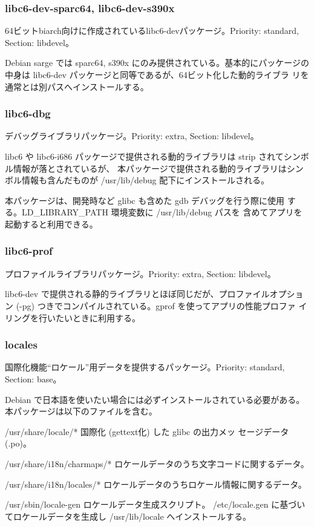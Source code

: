 \documentclass[mingoth,a4paper]{jsarticle}
\newenvironment{gdescription}%
{%
   \begin{list}{}%
   {%
      \setlength{\itemindent}{0mm}
      \setlength{\leftmargin}{45mm}%
      \setlength{\rightmargin}{0zw}%
      \setlength{\labelsep}{4mm}%
      \setlength{\labelwidth}{4cm}%
      \setlength{\itemsep}{0em}%
      \setlength{\parsep}{0cm}%
      \setlength{\listparindent}{0cm}%
      \let\makelabel\gdescriptionlabel
   }
}{%
   \end{list}%
}
\newcommand*\gdescriptionlabel[1]{\hspace\labelsep\normalfont\bfseries #1}
\begin{document}
  \subsubsection{libc6-dev-sparc64, libc6-dev-s390x}

    64ビットbiarch向けに作成されているlibc6-devパッケージ。Priority: standard, Section:
    libdevel。

    Debian sarge では
    sparc64, s390x にのみ提供されている。基本的にパッケージの中身は 
    libc6-dev パッケージと同等であるが、64ビット化した動的ライブラ
    リを通常とは別パスへインストールする。
 
  \subsubsection{libc6-dbg}

    デバッグライブラリパッケージ。Priority: extra, Section: libdevel。

    libc6 や libc6-i686 パッケージで提供される動的ライブラリは
    strip されてシンボル情報が落とされているが、
    本パッケージで提供される動的ライブラリはシンボル情報も含んだものが
    /usr/lib/debug 配下にインストールされる。
    
    本パッケージは、開発時など glibc も含めた gdb デバッグを行う際に使用
    する。LD\_LIBRARY\_PATH 環境変数に /usr/lib/debug パスを
    含めてアプリを起動すると利用できる。

  \subsubsection{libc6-prof}

    プロファイルライブラリパッケージ。Priority: extra, Section: libdevel。

    libc6-dev で提供される静的ライブラリとほぼ同じだが、プロファイルオプション
    (-pg) つきでコンパイルされている。gprof を使ってアプリの性能プロファ
    イリングを行いたいときに利用する。

  \subsubsection{locales}

    国際化機能``ロケール''用データを提供するパッケージ。Priority: standard, Section: base。    

    Debian で日本語を使いたい場合には必ずインストールされている必要がある。本パッケージは以下のファイルを含む。

    \begin{gdescription}
      \item[/usr/share/locale/*] 国際化 (gettext化) した glibc の出力メッ
		 セージデータ(.po)。
      \item[/usr/share/i18n/charmaps/*] ロケールデータのうち文字コードに関するデータ。
      \item[/usr/share/i18n/locales/*] ロケールデータのうちロケール情報に関するデータ。
      \item[/usr/sbin/locale-gen] ロケールデータ生成スクリプト。
		 /etc/locale.gen に基づいてロケールデータを生成し
		 /usr/lib/locale へインストールする。
    \end{gdescription}
\end{document}
